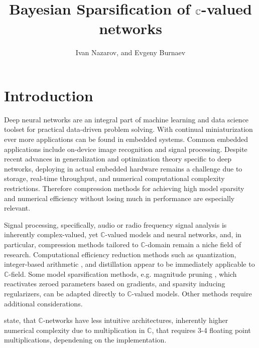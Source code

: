 \documentclass[a4paper,10pt]{article}
\title{Bayesian Sparsification of $\cplx$-valued networks}
\author{Ivan Nazarov, and Evgeny Burnaev}
\newcommand{\cplx}{\mathbb{C}}
\begin{document}
\maketitle

\section{Introduction} %
\label{sec:introduction}

Deep neural networks are an integral part of machine learning and data science toolset
for practical data-driven problem solving. With continual miniaturization ever more
applications can be found in embedded systems. Common embedded applications include
on-device image recognition and signal processing. Despite recent advances in generalization
and optimization theory specific to deep networks, deploying in actual embedded hardware
remains a challenge due to storage, real-time throughput, and numerical computational
complexity restrictions. Therefore compression methods for achieving high model sparsity
and numerical efficiency without losing much in performance are especially relevant.

Signal processing, specifically, audio or radio frequency signal analysis is inherently
complex-valued, yet $\cplx$-valued models and neural networks, and, in particular, compression
methods tailored to $\cplx$-domain remain a niche field of research. Computational efficiency
reduction methods such as quantization, integer-based arithmetic \citep{citation_needed},
and distillation \citep{distillation} appear to be immediately applicable to $\cplx$-field.
%
Some model sparsification methods, e.g. magnitude pruning \citep{zuo_compression_2019}, which
reactivates zeroed parameters based on gradients, and sparsity inducing regularizers, can be
adapted directly to $\cplx$-valued models. Other methods require additional considerations.

\citet{monning_evaluation_2018} state,
that $\cplx$-networks have less intuitive architectures, inherently higher numerical
complexity due to multiplication in $\cplx$, that requires 3-4 floating point multiplications,
dependening on the implementation.
\end{document}
